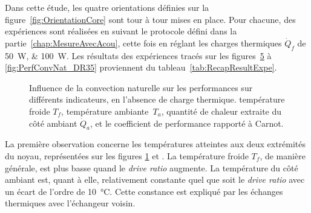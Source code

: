 Dans cette étude, les quatre orientations définies sur la figure~\ref{fig:OrientationCore} sont tour à tour mises en place. Pour chacune, des expériences sont réalisées en suivant le protocole défini dans la partie~\ref{chap:MesureAvecAcou}, cette fois en réglant les charges thermiques $\dot Q_f$ de \qtylist{50;100}{\watt}. Les résultats des expériences tracés sur les figures~\ref{fig:PerfConvNat} à \ref{fig:PerfConvNat_DR35} proviennent du tableau~\ref{tab:RecapResultExpe}.\medskip


\begin{figure}[!ht]
    \centering
	\begin{subfigure}{.48\textwidth}
		\centering
        
		\label{fig:PerfConvNat_Tf}
	\end{subfigure}%
	\begin{subfigure}{.48\textwidth}
		\centering
        
		\label{fig:PerfConvNat_Ta}
	\end{subfigure}
	
	\vspace{1cm}
	
	\begin{subfigure}{.48\textwidth}
		\centering
        
		\label{fig:PerfConvNat_Qa}
	\end{subfigure}%
	\begin{subfigure}{.48\textwidth}
		\centering
        
		\label{fig:PerfConvNat_COP}
	\end{subfigure}	     
    \caption{Influence de la convection naturelle sur les performances sur différents indicateurs, en l'absence de charge thermique.  température froide $T_f$,  température ambiante~$T_a$,  quantité de chaleur extraite du côté ambiant $\dot Q_a$, et  le coefficient de performance rapporté à Carnot. }
    \label{fig:PerfConvNat}
\end{figure}

La première observation concerne les températures atteintes aux deux extrémités du noyau, représentées sur les figures \ref{fig:PerfConvNat_Tf} et . La température froide $T_f$, de manière générale, est plus basse quand le \textit{drive ratio} augmente. La température du côté ambiant est, quant à elle, relativement constante quel que soit le \textit{drive ratio} avec un écart de l'ordre de \qty{10}{\degreeCelsius}. Cette constance est expliqué par les échanges thermiques avec l'échangeur voisin.\smallskip

